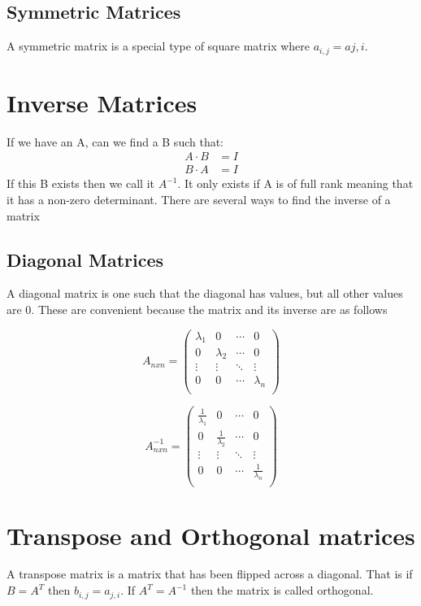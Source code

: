 \subsection{Symmetric Matrices}
A symmetric matrix is a special type of square matrix where $a_{i,j}=a{j,i}$.

\section{Inverse Matrices}
If we have an A, can we find a B such that:
\begin{align*}
    A \cdot B &= I \\
    B \cdot A &= I
\end{align*}
If this B exists then we call it $A^{-1}$.
It only exists if A is of full rank meaning that it has a non-zero determinant.
There are several ways to find the inverse of a matrix
\subsection{Diagonal Matrices}
A diagonal matrix is one such that the diagonal has values, but all other values are 0. These are convenient because the matrix and its inverse are as follows

\begin{equation*}
A_{nxn} = 
    \begin{pmatrix}
    \lambda_1 & 0 & \cdots & 0 \\
    0 & \lambda_2 & \cdots & 0 \\
    \vdots & \vdots & \ddots & \vdots \\
    0 & 0 & \cdots & \lambda_n \\
    \end{pmatrix}
\end{equation*}

\begin{equation*}
A^{-1}_{nxn} = 
    \begin{pmatrix}
    \frac{1}{\lambda_1} & 0 & \cdots & 0 \\
    0 & \frac{1}{\lambda_2} & \cdots & 0 \\
    \vdots & \vdots & \ddots & \vdots \\
    0 & 0 & \cdots & \frac{1}{\lambda_n} \\
    \end{pmatrix}
\end{equation*}


\section{Transpose and Orthogonal matrices}
A transpose matrix is a matrix that has been flipped across a diagonal. That is if $B = A^{T}$ then $b_{i,j}=a_{j,i}$. If $A^{T}=A^{-1}$ then the matrix is called orthogonal.



